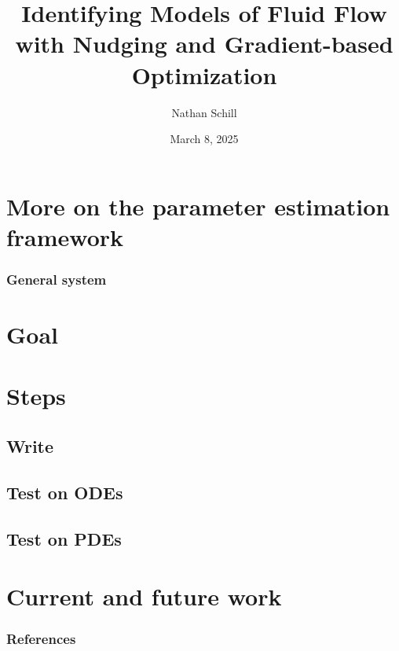 \documentclass{beamer}
\title{Identifying Models of Fluid Flow with Nudging and Gradient-based Optimization}
\author{Nathan Schill}
\institute{Brigham Young University}
\date{March 8, 2025}
\begin{document}
\frame{\titlepage}

\section{More on the parameter estimation framework}

\begin{frame}
    \frametitle{General system}
\end{frame}

\section{Goal}

\section{Steps}

\subsection{Write}

\subsection{Test on ODEs}

\subsection{Test on PDEs}

\section{Current and future work}

\begin{frame}
    \frametitle{References}
    \nocite{*}
    \printbibliography
\end{frame}
\end{document}
